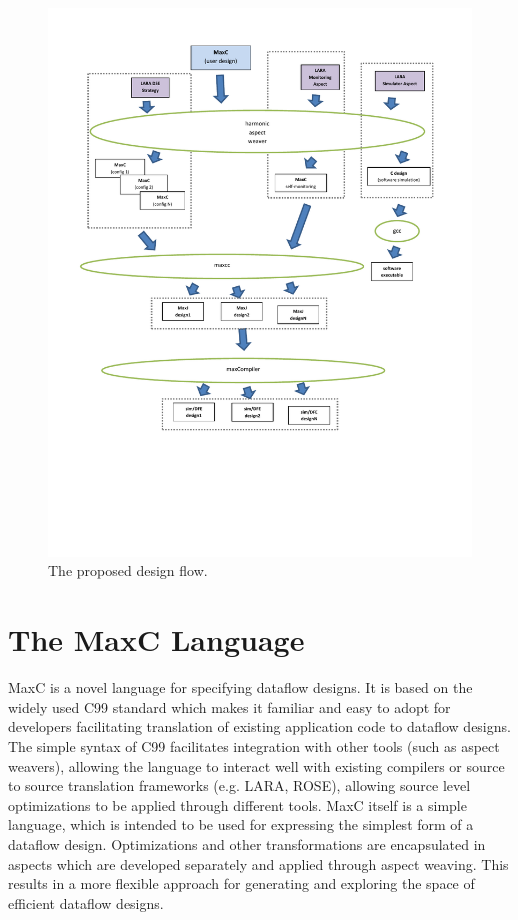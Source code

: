 \begin{figure}[!h]
  \includegraphics[scale=0.5, trim=50 180 0 50]{lara_maxcc.pdf}
  \caption{The proposed design flow.}
  \label{fig:design-flow}
\end{figure}


\section{The  MaxC Language}

MaxC is a novel language for specifying dataflow designs. It is based
on the widely used C99 standard which makes it familiar and easy to
adopt for developers facilitating translation of existing application
code to dataflow designs. The simple syntax of C99 facilitates
integration with other tools (such as aspect weavers), allowing the
language to interact well with existing compilers or source to source
translation frameworks (e.g. LARA, ROSE), allowing source level
optimizations to be applied through different tools. MaxC itself is a
simple language, which is intended to be used for expressing the
simplest form of a dataflow design. Optimizations and other
transformations are encapsulated in aspects which are developed
separately and applied through aspect weaving. This results in a more
flexible approach for generating and exploring the space of efficient
dataflow designs.

